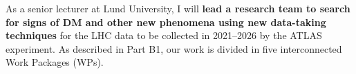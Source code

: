 As a senior lecturer at Lund University, I will \textbf{lead a research team to search for signs of DM and other new phenomena using new data-taking techniques} for the LHC data to be collected in 2021--2026 by the ATLAS experiment. 
As described in Part B1, our work is divided in five interconnected Work Packages (WPs). %

